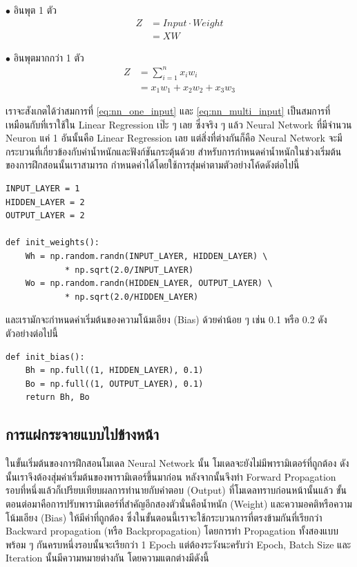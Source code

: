 \noindent $\bullet$ อินพุต 1 ตัว
\begin{align}\label{eq:nn_one_input}
    Z &= Input \cdot Weight \nonumber \\
    &= X W
\end{align}

\noindent $\bullet$ อินพุตมากกว่า 1 ตัว
\begin{align}\label{eq:nn_multi_input}
    Z &= \sum_{i=1}^{n}x_i w_i \nonumber \\
    &= x_1 w_1 + x_2 w_2 + x_3 w_3
\end{align}

เราจะสังเกตได้ว่าสมการที่ \ref{eq:nn_one_input} และ \ref{eq:nn_multi_input} เป็นสมการที่เหมือนกับที่เราใช้ใน Linear 
Regression เป๊ะ ๆ เลย ซึ่งจริง ๆ แล้ว Neural Network ที่มีจำนวน Neuron แค่ 1 อันนั้นคือ Linear Regression เลย แต่สิ่งที่ต่างกันก็คือ
Neural Network จะมีกระบวนที่เกี่ยวข้องกับค่าน้ำหนักและฟังก์ชันกระตุ้นด้วย สำหรับการกำหนดค่าน้ำหนักในช่วงเริ่มต้นของการฝึกสอนนั้นเราสามารถ%
กำหนดค่าได้โดยใช้การสุ่มค่าตามตัวอย่างโค้ดดังต่อไปนี้

\begin{lstlisting}[style=MyPython]
INPUT_LAYER = 1
HIDDEN_LAYER = 2
OUTPUT_LAYER = 2

def init_weights():
    Wh = np.random.randn(INPUT_LAYER, HIDDEN_LAYER) \
            * np.sqrt(2.0/INPUT_LAYER)
    Wo = np.random.randn(HIDDEN_LAYER, OUTPUT_LAYER) \
            * np.sqrt(2.0/HIDDEN_LAYER)
\end{lstlisting}

\noindent และเรามักจะกำหนดค่าเริ่มต้นของความโน้มเอียง (Bias) ด้วยค่าน้อย ๆ เช่น 0.1 หรือ 0.2 ดังตัวอย่างต่อไปนี้

\begin{lstlisting}[style=MyPython]
def init_bias():
    Bh = np.full((1, HIDDEN_LAYER), 0.1)
    Bo = np.full((1, OUTPUT_LAYER), 0.1)
    return Bh, Bo
\end{lstlisting}

\subsection{การแผ่กระจายแบบไปข้างหน้า}
\label{ssec:forward_prop}

ในขั้นเริ่มต้นของการฝึกสอนโมเดล Neural Network นั้น โมเดลจะยังไม่มีพารามิเตอร์ที่ถูกต้อง ดังนั้นเราจึงต้องสุ่มค่าเริ่มต้นของพารามิเตอร์ขึ้นมาก่อน
หลังจากนั้นจึงทำ Forward Propagation รอบที่หนึ่งแล้วก็เปรียบเทียบผลการทำนายกับคำตอบ (Output) ที่โมเดลทราบก่อนหน้านั้นแล้ว
ขั้นตอนต่อมาคือการปรับพารามิเตอร์ที่สำคัญอีกสองตัวนั่นคือน้ำหนัก (Weight) และความอคติหรือความโน้มเอียง (Bias) ให้มีค่าที่ถูกต้อง 
ซึ่งในขั้นตอนนี้เราจะใช้กระบวนการที่ตรงข้ามกันที่เรียกว่า Backward propagation (หรือ Backpropagation) โดยการทำ Propagation 
ทั้งสองแบบพร้อม ๆ กันครบหนึ่งรอบนั้นจะเรียกว่า 1 Epoch แต่ต้องระวังนะครับว่า Epoch, Batch Size และ Iteration นั้นมีความหมายต่างกัน 
โดยความแตกต่างมีดังนี้

